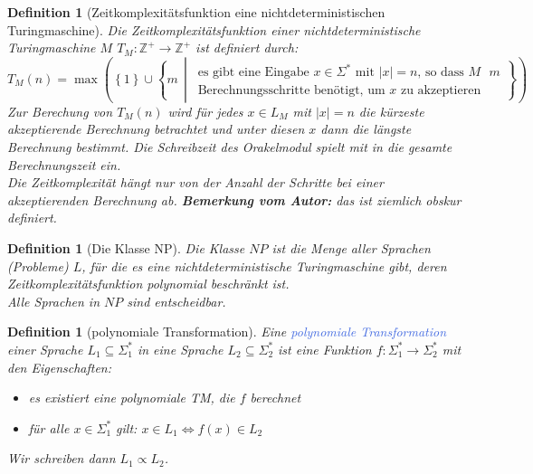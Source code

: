 \documentclass[11pt]{article}
\newcommand{\tcol}[1]{\textcolor{RoyalBlue}{#1}}
\newcommand{\set}[1]{\left\lbrace #1\right\rbrace}
\theoremstyle{break}
\newtheorem{defi}[satz]{Definition}
\begin{document}
    \begin{defi}[Zeitkomplexitätsfunktion eine nichtdeterministischen Turingmaschine]
        Die Zeitkomplexitätsfunktion einer nichtdeterministische Turingmaschine $M$ $T_M\colon\mathbb{Z}^+\to\mathbb{Z}^+$ ist definiert durch:
        \[
            T_M(n)=\max\left(\set{1}\cup\set{m\,\middle|\,
            \begin{array}{c}
                \text{es gibt eine Eingabe $x\in\Sigma^*$ mit $|x|=n$, so dass $M$ $m$}\\
                \text{Berechnungsschritte benötigt, um $x$ zu akzeptieren}
            \end{array}}\right)
        \]
        Zur Berechung von $T_M(n)$ wird für jedes $x\in L_M$ mit $|x|=n$ die kürzeste akzeptierende Berechnung betrachtet und unter diesen $x$ dann die längste Berechnung bestimmt.
        Die Schreibzeit des Orakelmodul spielt mit in die gesamte Berechnungszeit ein.\\
        Die Zeitkomplexität hängt nur von der Anzahl der Schritte bei einer akzeptierenden Berechnung ab.
        \textbf{Bemerkung vom Autor:} das ist ziemlich obskur definiert.
    \end{defi}

    \begin{defi}[Die Klasse NP]
        Die Klasse $NP$ ist die Menge aller Sprachen (Probleme) $L$, für die es eine nichtdeterministische Turingmaschine gibt, deren Zeitkomplexitätsfunktion polynomial beschränkt ist.\\
        Alle Sprachen in $NP$ sind entscheidbar.
    \end{defi}

    \begin{defi}[polynomiale Transformation]
        Eine \tcol{polynomiale Transformation} einer Sprache $L_1\subseteq\Sigma_1^*$ in eine Sprache $L_2\subseteq\Sigma_2^*$ ist eine Funktion $f\colon\Sigma_1^*\to\Sigma_2^*$ mit den Eigenschaften:
        \begin{itemize}
            \item es existiert eine polynomiale TM, die $f$ berechnet
            \item für alle $x\in\Sigma_1^*$ gilt: $x\in L_1\Leftrightarrow f(x)\in L_2$
        \end{itemize}
        Wir schreiben dann $L_1\propto L_2$.
    \end{defi}
\end{document}
